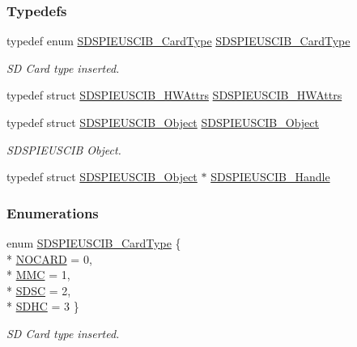 \subsubsection*{Typedefs}
\begin{DoxyCompactItemize}
\item 
typedef enum \hyperlink{_s_d_s_p_i_e_u_s_c_i_b_8h_a4fa2b3bc20d44e2e53e621d22a3d77a3}{S\-D\-S\-P\-I\-E\-U\-S\-C\-I\-B\-\_\-\-Card\-Type} \hyperlink{_s_d_s_p_i_e_u_s_c_i_b_8h_afa0443874109de3105ef57c073c64b87}{S\-D\-S\-P\-I\-E\-U\-S\-C\-I\-B\-\_\-\-Card\-Type}
\begin{DoxyCompactList}\small\item\em S\-D Card type inserted. \end{DoxyCompactList}\item 
typedef struct \hyperlink{struct_s_d_s_p_i_e_u_s_c_i_b___h_w_attrs}{S\-D\-S\-P\-I\-E\-U\-S\-C\-I\-B\-\_\-\-H\-W\-Attrs} \hyperlink{_s_d_s_p_i_e_u_s_c_i_b_8h_aea56375febef1b4ef0811bedfa893353}{S\-D\-S\-P\-I\-E\-U\-S\-C\-I\-B\-\_\-\-H\-W\-Attrs}
\item 
typedef struct \hyperlink{struct_s_d_s_p_i_e_u_s_c_i_b___object}{S\-D\-S\-P\-I\-E\-U\-S\-C\-I\-B\-\_\-\-Object} \hyperlink{_s_d_s_p_i_e_u_s_c_i_b_8h_a30154e86f98fbe35ef728bbc1d256029}{S\-D\-S\-P\-I\-E\-U\-S\-C\-I\-B\-\_\-\-Object}
\begin{DoxyCompactList}\small\item\em S\-D\-S\-P\-I\-E\-U\-S\-C\-I\-B Object. \end{DoxyCompactList}\item 
typedef struct \hyperlink{struct_s_d_s_p_i_e_u_s_c_i_b___object}{S\-D\-S\-P\-I\-E\-U\-S\-C\-I\-B\-\_\-\-Object} $\ast$ \hyperlink{_s_d_s_p_i_e_u_s_c_i_b_8h_a8561b77d1d064496fd178fcf32053ea3}{S\-D\-S\-P\-I\-E\-U\-S\-C\-I\-B\-\_\-\-Handle}
\end{DoxyCompactItemize}
\subsubsection*{Enumerations}
\begin{DoxyCompactItemize}
\item 
enum \hyperlink{_s_d_s_p_i_e_u_s_c_i_b_8h_a4fa2b3bc20d44e2e53e621d22a3d77a3}{S\-D\-S\-P\-I\-E\-U\-S\-C\-I\-B\-\_\-\-Card\-Type} \{ \\*
\hyperlink{_s_d_s_p_i_e_u_s_c_i_b_8h_a4fa2b3bc20d44e2e53e621d22a3d77a3a422cdc20ba86c8cdcf1f0fd2318a1cfc}{N\-O\-C\-A\-R\-D} = 0, 
\\*
\hyperlink{_s_d_s_p_i_e_u_s_c_i_b_8h_a4fa2b3bc20d44e2e53e621d22a3d77a3aa7d8fca3406f36682514f0384d910fac}{M\-M\-C} = 1, 
\\*
\hyperlink{_s_d_s_p_i_e_u_s_c_i_b_8h_a4fa2b3bc20d44e2e53e621d22a3d77a3a87550a2102744c14e5e2e0ed39cc04b2}{S\-D\-S\-C} = 2, 
\\*
\hyperlink{_s_d_s_p_i_e_u_s_c_i_b_8h_a4fa2b3bc20d44e2e53e621d22a3d77a3ab27db2a19a825c3e6f1513cdab7c81ea}{S\-D\-H\-C} = 3
 \}
\begin{DoxyCompactList}\small\item\em S\-D Card type inserted. \end{DoxyCompactList}\end{DoxyCompactItemize}
